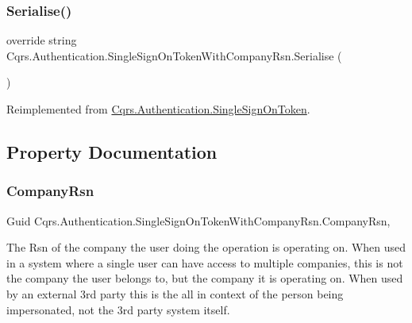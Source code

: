 \subsubsection{\texorpdfstring{Serialise()}{Serialise()}}
{\footnotesize\ttfamily override string Cqrs.\+Authentication.\+Single\+Sign\+On\+Token\+With\+Company\+Rsn.\+Serialise (\begin{DoxyParamCaption}{ }\end{DoxyParamCaption})\hspace{0.3cm}{\ttfamily [virtual]}}



Reimplemented from \hyperlink{classCqrs_1_1Authentication_1_1SingleSignOnToken_a5e859c6c5db5aaa9ef4e8f2086df4604_a5e859c6c5db5aaa9ef4e8f2086df4604}{Cqrs.\+Authentication.\+Single\+Sign\+On\+Token}.



\subsection{Property Documentation}
\mbox{\label{classCqrs_1_1Authentication_1_1SingleSignOnTokenWithCompanyRsn_abb327084c1ff87de84c92008b4437675_abb327084c1ff87de84c92008b4437675}} 
\subsubsection{\texorpdfstring{Company\+Rsn}{CompanyRsn}}
{\footnotesize\ttfamily Guid Cqrs.\+Authentication.\+Single\+Sign\+On\+Token\+With\+Company\+Rsn.\+Company\+Rsn\hspace{0.3cm}{\ttfamily [get]}, {\ttfamily [set]}}



The Rsn of the company the user doing the operation is operating on. When used in a system where a single user can have access to multiple companies, this is not the company the user belongs to, but the company it is operating on. When used by an external 3rd party this is the all in context of the person being impersonated, not the 3rd party system itself. 

